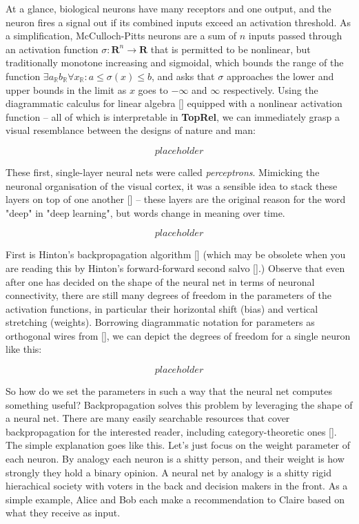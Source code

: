  At a glance, biological neurons have many receptors and one output, and the neuron fires a signal out if its combined inputs exceed an activation threshold. As a simplification, McCulloch-Pitts neurons are a sum of $n$ inputs passed through an activation function $\sigma: \mathbf{R}^n \rightarrow \mathbf{R}$ that is permitted to be nonlinear, but traditionally monotone increasing and sigmoidal, which bounds the range of the function $\exists a_{\mathbb{R}} b_{\mathbb{R}} \forall x_{\mathbb{R}} : a \leq \sigma(x) \leq b$, and asks that $\sigma$ approaches the lower and upper bounds in the limit as $x$ goes to $-\infty$ and $\infty$ respectively. Using the diagrammatic calculus for linear algebra [] equipped with a nonlinear activation function -- all of which is interpretable in \textbf{TopRel}, we can immediately grasp a visual resemblance between the designs of nature and man:

\[placeholder\]

 These first, single-layer neural nets were called \emph{perceptrons}. Mimicking the neuronal organisation of the visual cortex, it was a sensible idea to stack these layers on top of one another [] -- these layers are the original reason for the word "deep" in "deep learning", but words change in meaning over time.

\[placeholder\]

 First is Hinton's backpropagation algorithm [] (which may be obsolete when you are reading this by Hinton's forward-forward second salvo [].) Observe that even after one has decided on the shape of the neural net in terms of neuronal connectivity, there are still many degrees of freedom in the parameters of the activation functions, in particular their horizontal shift (bias) and vertical stretching (weights). Borrowing diagrammatic notation for parameters as orthogonal wires from [], we can depict the degrees of freedom for a single neuron like this:

\[placeholder\]

 So how do we set the parameters in such a way that the neural net computes something useful? Backpropagation solves this problem by leveraging the shape of a neural net. There are many easily searchable resources that cover backpropagation for the interested reader, including category-theoretic ones []. The simple explanation goes like this. Let's just focus on the weight parameter of each neuron. By analogy each neuron is a shitty person, and their weight is how strongly they hold a binary opinion. A neural net by analogy is a shitty rigid hierachical society with voters in the back and decision makers in the front. As a simple example, Alice and Bob each make a recommendation to Claire based on what they receive as input.

